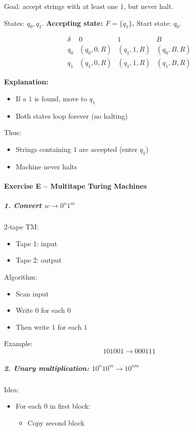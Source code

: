 \documentclass[11pt, a4paper]{article}
\theoremstyle{definition}
\theoremstyle{remark}
\begin{document}
Goal: accept strings with at least one $1$, but never halt.

States: $q_0, q_1$. \quad \textbf{Accepting state: $F = \{q_1\}$.} \quad Start state: $q_0$.

\[
\begin{array}{c|c|c|c}
\delta & 0 & 1 & B \\
\hline
q_0 & (q_0,0,R) & (q_1,1,R) & (q_0,B,R) \\
q_1 & (q_1,0,R) & (q_1,1,R) & (q_1,B,R)
\end{array}
\]

\textbf{Explanation:}
\begin{itemize}
    \item If a $1$ is found, move to $q_1$
    \item Both states loop forever (no halting)
\end{itemize}

Thus:
\begin{itemize}
    \item Strings containing $1$ are accepted (enter $q_1$)
    \item Machine never halts
\end{itemize}


\paragraph{Exercise E -- Multitape Turing Machines}

\subparagraph{1. Convert $w \rightarrow 0^n1^m$}

2-tape TM:

\begin{itemize}
    \item Tape 1: input
    \item Tape 2: output
\end{itemize}

Algorithm:
\begin{itemize}
    \item Scan input
    \item Write $0$ for each $0$
    \item Then write $1$ for each $1$
\end{itemize}

Example:
\[
101001 \rightarrow 000111
\]


\subparagraph{2. Unary multiplication: $10^n10^m \rightarrow 10^{nm}$}

Idea:
\begin{itemize}
    \item For each $0$ in first block:
    \begin{itemize}
        \item Copy second block
    \end{itemize}
\end{itemize}
\end{document}
